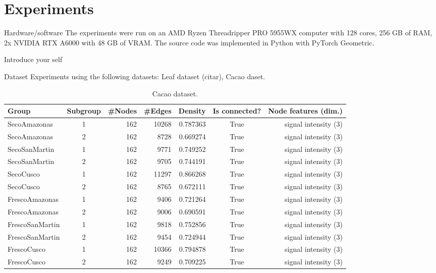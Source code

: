 \documentclass[aspectratio=169]{beamer}
\begin{document}
\section{Experiments}
    \begin{frame}{Hardware/software}
        The experiments were run on an AMD Ryzen Threadripper PRO 5955WX computer with 128 cores, 256 GB of RAM, 2x NVIDIA RTX A6000 with 48 GB of VRAM. The source code was implemented in Python with PyTorch Geometric.

        \begin{note}
            {Introduce your self}
        \end{note}
    \end{frame}

    \begin{frame}{Dataset}
        Experiments using the following datasets: Leaf dataset (citar), Cacao daset.

        \begin{table}[htp!]
            \scriptsize
            \centering
            \caption{Cacao dataset.} %
            \begin{tabular}{@{}lcrrrcr@{}}\toprule
                Group & Subgroup & \#Nodes  & \#Edges & Density & Is connected? & Node features (dim.) \\\midrule
                SecoAmazonas &	1 &	162	& 10268 &	0.787363 &	True &	signal intensity (3) \\
                SecoAmazonas &	2 &	162	& 8728 &	0.669274 &	True &	signal intensity (3) \\\midrule
                SecoSanMartin &	1 &	162	& 9771 &	0.749252 &	True &	signal intensity (3) \\
                SecoSanMartin &	2 &	162	& 9705 &	0.744191 &	True &	signal intensity (3) \\\midrule
                SecoCusco &	1 &	162	& 11297 &	0.866268& 	True &	signal intensity (3) \\
                SecoCusco &	2 &	162	& 8765 &	0.672111& 	True &	signal intensity (3) \\\midrule
                FrescoAmazonas &	1 &	162 &	9406 &	0.721264 &	True &	signal intensity (3) \\
                FrescoAmazonas &	2 &	162 &	9006 &	0.690591 &	True &	signal intensity (3) \\\midrule
                FrescoSanMartin &	1 &	162 &	9818 &	0.752856 &	True &	signal intensity (3) \\
                FrescoSanMartin &	2 &	162 &	9454 &	0.724944 &	True &	signal intensity (3) \\\midrule
                FrescoCusco &	1 &	162 &	10366 &	0.794878 &	True &	signal intensity (3) \\
                FrescoCusco &	2 &	162 &	9249 &	0.709225 &	True &	signal intensity (3) \\\bottomrule 
            \end{tabular}
        \end{table}


\end{frame}
\end{document}
